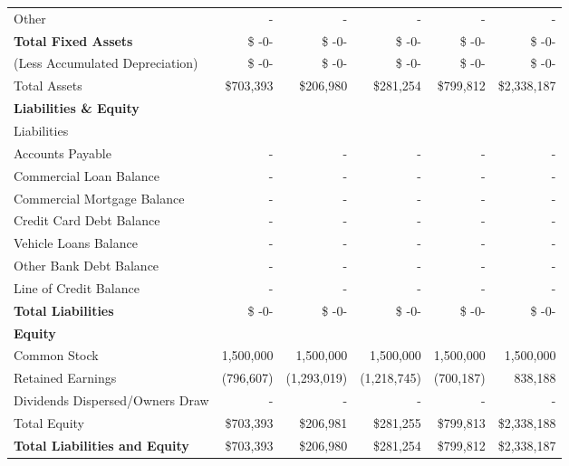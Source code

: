 \documentclass[10pt,openany]{book}
\begin{document}
\begin{landscape}
\begin{center}
\begin{longtable}[\textwidth]{@{}p{10cm}rrrrr@{}}
      \hspace{3mm} Other & - & - & - & - & - \\
      \hfill \textbf{Total Fixed Assets} & \$ -0- & \$ -0- & \$ -0- & \$ -0- & \$ -0- \\
      \hspace{3mm} (Less Accumulated Depreciation) & \$ -0- & \$ -0- & \$ -0- & \$ -0- & \$ -0- \\
      \hspace{0mm} Total Assets & \$703,393 & \$206,980 & \$281,254 & \$799,812 & \$2,338,187 \\
      \textbf{Liabilities \& Equity} & & & & & \\
      \midrule
      \hspace{3mm} Liabilities & & & & & \\
      \hspace{3mm} Accounts Payable & - & - & - & - & - \\
      \hspace{3mm} Commercial Loan Balance & - & - & - & - & - \\
      \hspace{3mm} Commercial Mortgage Balance & - & - & - & - & - \\
      \hspace{3mm} Credit Card Debt Balance & - & - & - & - & - \\
      \hspace{3mm} Vehicle Loans Balance & - & - & - & - & - \\
      \hspace{3mm} Other Bank Debt Balance & - & - & - & - & - \\
      \hspace{3mm} Line of Credit Balance & - & - & - & - & - \\
      \hfill \textbf{Total Liabilities} & \$ -0- & \$ -0- & \$ -0- & \$ -0- & \$ -0- \\
      \textbf{Equity} & & & & & \\
      \midrule
      \hspace{3mm} Common Stock & 1,500,000 & 1,500,000 & 1,500,000 & 1,500,000 & 1,500,000 \\
      \hspace{3mm} Retained Earnings & (796,607) & (1,293,019) & (1,218,745) & (700,187) & 838,188 \\
      \hspace{3mm} Dividends Dispersed/Owners Draw & - & - & - & - & - \\
      \hfill Total Equity & \$703,393 & \$206,981 & \$281,255 & \$799,813 & \$2,338,188 \\
      \textbf{Total Liabilities and Equity} & \$703,393 & \$206,980 & \$281,254 & \$799,812 & \$2,338,187 \\
      \bottomrule
    \end{longtable}
  \end{center}
\end{landscape}
\end{document}
